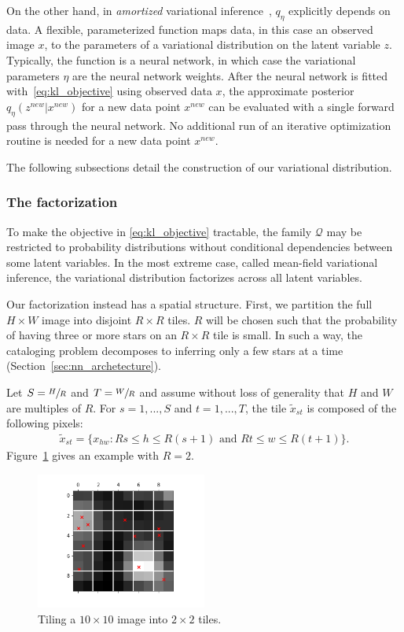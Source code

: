 On the other hand, 
in {\itshape amortized} variational
inference~\cite{kingma2013autoencoding, rezende2014stochastic}, $q_\eta$ explicitly depends on data. 
A flexible, parameterized function maps data, in this case an observed image $x$, to the parameters of a variational distribution on the latent variable $z$. 
Typically, the function is a neural network, in which case the variational parameters $\eta$ are the neural network weights. 
After the neural network is fitted with~\eqref{eq:kl_objective} using observed data $x$, the approximate posterior $q_\eta(z^{new} | x^{new})$ for a new data point 
$x^{new}$ can be evaluated with a single forward pass through the neural network. 
No additional run of an iterative optimization routine is needed for a new data point $x^{new}$. 


The following subsections detail the construction of our variational distribution. 

\subsubsection{The factorization}
\label{sec:factorization}
To make the objective in \eqref{eq:kl_objective} tractable, the family $\mathcal{Q}$ may be restricted to probability distributions 
without conditional dependencies between some latent variables. In the most extreme case, called mean-field variational inference, the variational distribution factorizes across all latent variables. 

Our factorization instead has a spatial structure. 
First, we partition the full $H \times W$ image into disjoint $R \times R$ tiles. 
$R$ will be chosen such that the probability of having three or more stars on an $R \times R$ tile is small. 
In such a way, the cataloging problem decomposes to inferring only a few stars at a time (Section~\ref{sec:nn_archetecture}). 

Let $S = \sfrac{H}{R}$ and $T = \sfrac{W}{R}$ and assume without loss of generality that $H$ and $W$ are multiples of $R$.
For $s = 1, ..., S$ and $t = 1, ..., T$,
the tile $\tilde x_{st}$ is composed of the following pixels:
\begin{align}
    \tilde x_{st} = \{x_{hw} : Rs \leq h \leq R(s+1) \text{ and } Rt \leq w \leq R(t+1)\}.
    \label{eq:tiles}
\end{align}
Figure~\ref{fig:ex_tiles} gives an example with $R = 2$. 
\begin{figure}[!ht]
    \centering
    \includegraphics[width = 0.5\textwidth]{figures/example_tiled.png}
    \vspace{-1cm}
    \caption{Tiling a $10 \times 10$ image into $2 \times 2$ tiles.}
    \label{fig:ex_tiles}
\end{figure}

